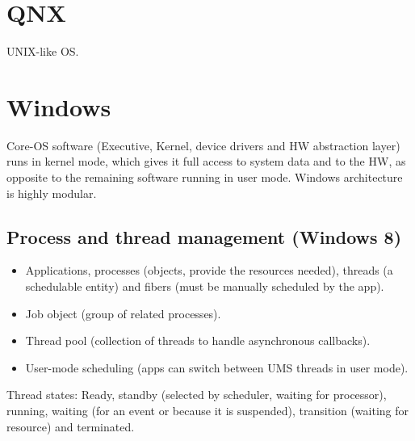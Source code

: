 \section{QNX}
UNIX-like OS.

\section{Windows}
Core-OS software (Executive, Kernel, device drivers and HW abstraction layer) runs in kernel mode, which gives it full access to system data and to the HW, as opposite to the remaining software running in user mode. Windows architecture is highly modular.

\subsection{Process and thread management (Windows 8)}
\begin{itemize}
    \item Applications, processes (objects, provide the resources needed), threads (a schedulable entity) and fibers (must be manually scheduled by the app).
    \item Job object (group of related processes).
    \item Thread pool (collection of threads to handle asynchronous callbacks).
    \item User-mode scheduling (apps can switch between UMS threads in user mode).
\end{itemize}
Thread states:
Ready, standby (selected by scheduler, waiting for processor), running, waiting (for an event or because it is suspended), transition (waiting for resource) and terminated.

